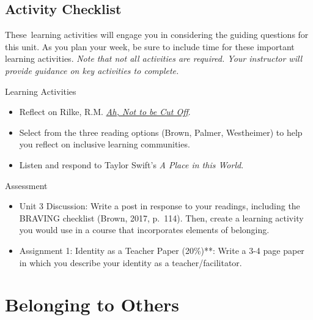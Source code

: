 \documentclass[
]{book}
\providecommand{\tightlist}{%
  \setlength{\itemsep}{0pt}\setlength{\parskip}{0pt}}
\begin{document}
\hypertarget{activity-checklist-2}{%
\subsection*{Activity Checklist}\label{activity-checklist-2}}

These~learning activities will engage you in considering the guiding questions for this unit. As you plan your week, be sure to include time for these important learning activities. \emph{Note that not all activities are required. Your instructor will provide guidance on key activities to complete.}

\begin{reflect}
{Learning Activities}

\begin{itemize}
\tightlist
\item
  Reflect on Rilke, R.M. \href{https://gladdestthing.com/poems/ah-not-to-be-cut-off}{\emph{Ah, Not to be Cut Off}}.\\
\item
  Select from the three reading options (Brown, Palmer, Westheimer) to help you reflect on inclusive learning communities.\\
\item
  Listen and respond to Taylor Swift's \emph{A Place in this World}.
\end{itemize}
\end{reflect}

\begin{assessment}
{Assessment}

\begin{itemize}
\tightlist
\item
  Unit 3 Discussion: Write a post in response to your readings, including the BRAVING checklist (Brown, 2017, p.~114). Then, create a learning activity you would use in a course that incorporates elements of belonging.\\
\item
  Assignment 1: Identity as a Teacher Paper (20\%)**: Write a 3-4 page paper in which you describe your identity as a teacher/facilitator.
\end{itemize}
\end{assessment}

\hypertarget{belonging-to-others-1}{%
\section{Belonging to Others}\label{belonging-to-others-1}}
\end{document}
